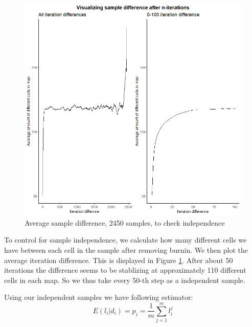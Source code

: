 \documentclass{article}
\begin{document}
\begin{figure}[h]	
	\begin{center} 
		\includegraphics[scale=0.48]{c3.png}
	\end{center}
	\caption{Average sample difference, 2450 samples, to check independence}
	\label{fig:c3} 
\end{figure}

To control for sample independence, we calculate how many different cells we have between each cell in the sample after removing burnin. We then plot the average iteration difference. This is displayed in Figure \ref{fig:c3}. After about 50 iterations the difference seems to be stablizing at approximately 110 different cells in each map. So we thus take every 50-th step as a independent sample.  

Using our independent samples we have following estimator:
\begin{equation}
	E(l_i|d_i) = p_i = \dfrac{1}{m}\sum_{j=1}^ml_i^j
\end{equation}
\end{document}
